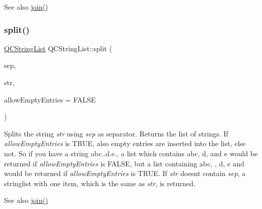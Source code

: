 \begin{DoxySeeAlso}{See also}
\mbox{\hyperlink{class_q_c_string_list_a6f889e803df00f762cbc6ce37bd9b5c0}{join()}} 
\end{DoxySeeAlso}
\mbox{\label{class_q_c_string_list_ae46355a1739a9545bdc3ab9e37c83758}} 
\subsubsection{\texorpdfstring{split()}{split()}\hspace{0.1cm}{\footnotesize\ttfamily [2/3]}}
{\footnotesize\ttfamily \mbox{\hyperlink{class_q_c_string_list}{Q\+C\+String\+List}} Q\+C\+String\+List\+::split (\begin{DoxyParamCaption}\item[{const \mbox{\hyperlink{class_q_c_string}{Q\+C\+String}} \&}]{sep,  }\item[{const \mbox{\hyperlink{class_q_c_string}{Q\+C\+String}} \&}]{str,  }\item[{bool}]{allow\+Empty\+Entries = {\ttfamily FALSE} }\end{DoxyParamCaption})\hspace{0.3cm}{\ttfamily [static]}}

Splits the string {\itshape str} using {\itshape sep} as separator. Returns the list of strings. If {\itshape allow\+Empty\+Entries} is T\+R\+UE, also empty entries are inserted into the list, else not. So if you have a string \textquotesingle{}abc..d.\+e.\textquotesingle{}, a list which contains \textquotesingle{}abc\textquotesingle{}, \textquotesingle{}d\textquotesingle{}, and \textquotesingle{}e\textquotesingle{} would be returned if {\itshape allow\+Empty\+Entries} is F\+A\+L\+SE, but a list containing \textquotesingle{}abc\textquotesingle{}, \textquotesingle{}\textquotesingle{}, \textquotesingle{}d\textquotesingle{}, \textquotesingle{}e\textquotesingle{} and \textquotesingle{}\textquotesingle{} would be returned if {\itshape allow\+Empty\+Entries} is T\+R\+UE. If {\itshape str} doesn\textquotesingle{}t contain {\itshape sep}, a stringlist with one item, which is the same as {\itshape str}, is returned.

\begin{DoxySeeAlso}{See also}
\mbox{\hyperlink{class_q_c_string_list_a6f889e803df00f762cbc6ce37bd9b5c0}{join()}} 
\end{DoxySeeAlso}
\mbox{\label{class_q_c_string_list_a6b29cc8c121790c5521b13d662fbf9fe}} 
